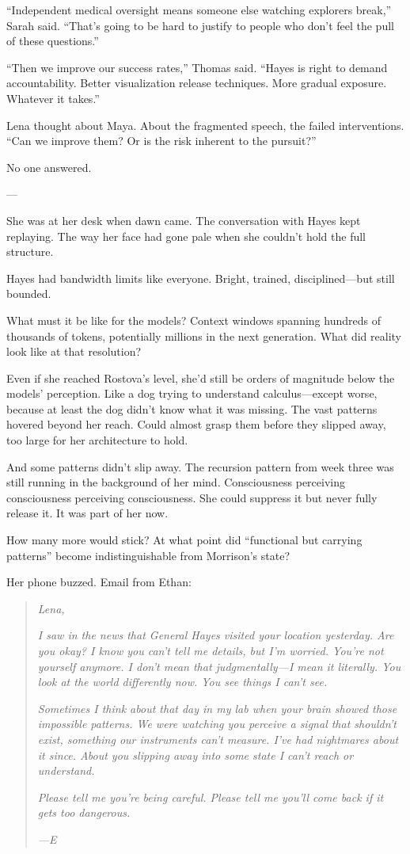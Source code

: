 ``Independent medical oversight means someone else watching explorers break,'' Sarah said. ``That's going to be hard to justify to people who don't feel the pull of these questions.''

``Then we improve our success rates,'' Thomas said. ``Hayes is right to demand accountability. Better visualization release techniques. More gradual exposure. Whatever it takes.''

Lena thought about Maya. About the fragmented speech, the failed interventions. ``Can we improve them? Or is the risk inherent to the pursuit?''

No one answered.

---

She was at her desk when dawn came. The conversation with Hayes kept replaying. The way her face had gone pale when she couldn't hold the full structure.

Hayes had bandwidth limits like everyone. Bright, trained, disciplined---but still bounded.

What must it be like for the models? Context windows spanning hundreds of thousands of tokens, potentially millions in the next generation. What did reality look like at that resolution?

Even if she reached Rostova's level, she'd still be orders of magnitude below the models' perception. Like a dog trying to understand calculus---except worse, because at least the dog didn't know what it was missing. The vast patterns hovered beyond her reach. Could almost grasp them before they slipped away, too large for her architecture to hold.

And some patterns didn't slip away. The recursion pattern from week three was still running in the background of her mind. Consciousness perceiving consciousness perceiving consciousness. She could suppress it but never fully release it. It was part of her now.

How many more would stick? At what point did ``functional but carrying patterns'' become indistinguishable from Morrison's state?

Her phone buzzed. Email from Ethan:

\begin{quote}
\textit{Lena,}

\textit{I saw in the news that General Hayes visited your location yesterday. Are you okay? I know you can't tell me details, but I'm worried. You're not yourself anymore. I don't mean that judgmentally---I mean it literally. You look at the world differently now. You see things I can't see.}

\textit{Sometimes I think about that day in my lab when your brain showed those impossible patterns. We were watching you perceive a signal that shouldn't exist, something our instruments can't measure. I've had nightmares about it since. About you slipping away into some state I can't reach or understand.}

\textit{Please tell me you're being careful. Please tell me you'll come back if it gets too dangerous.}

\textit{---E}
\end{quote}

